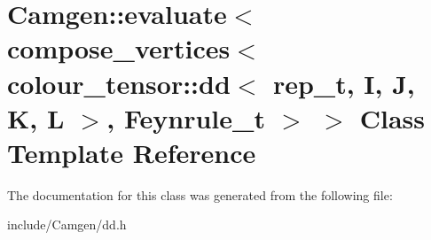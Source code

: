 \hypertarget{a00165}{\section{Camgen\-:\-:evaluate$<$ compose\-\_\-vertices$<$ colour\-\_\-tensor\-:\-:dd$<$ rep\-\_\-t, I, J, K, L $>$, Feynrule\-\_\-t $>$ $>$ Class Template Reference}
\label{a00165}
}


The documentation for this class was generated from the following file\-:\begin{DoxyCompactItemize}
\item 
include/\-Camgen/dd.\-h\end{DoxyCompactItemize}
